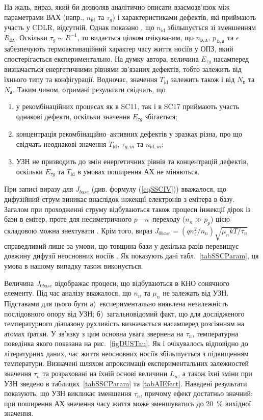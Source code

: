 На жаль, вираз, який би дозволяв аналітично описати взаємозв'язок між параметрами ВАХ (напр., $n_{\mathrm{id}}$ та $\tau_g$)
і характеристиками дефектів, які приймають участь у CDLR, відсутній.
Однак показано \cite{CDLR:JAP1995,CDLR:SSP}, що $n_{\mathrm{id}}$ збільшується зі зменшенням $R_{\mathtt{DA}}$.
Оскільки $\tau_g\sim R^{-1}$,
то видається цілком очікуваним, що $n_{\mathtt{D,A}}$, $p_{\,\mathtt{D,A}}$ та $\epsilon$ забезпечують термоактиваційний характер часу життя носіїв у ОПЗ, який спостерігається експериментально.
На  думку автора, величина $E_{\tau g}$ насамперед визначається енергетичними рівнями зв'язаних дефектів, тобто
залежить від їхнього типу та конфігурації.
Водночас, значення $T_\mathrm{id}$ залежить також і від $N_\mathtt{D}$ та $N_\mathtt{A}$.
Таким чином, отримані результати свідчать, що
\begin{enumerate}[label=\asbuk*),leftmargin=0em,itemindent=1.5em]
\item у рекомбінаційних процесах як в SC11, так і в SC17 приймають участь однакові дефекти, оскільки значення $E_{\tau g}$ збігається;
\item концентрація рекомбінаційно--активних дефектів у зразках різна, про що свідчать неоднакові значення $T_\mathrm{id}$, $\tau_{g,in}$ та $n_{\mathrm{id},in}$;
\item УЗН не призводить до змін енергетичних рівнів та концентрацій дефектів, оскільки  $E_{\tau g}$ та $T_\mathrm{id}$ в умовах поширення АХ не міняються.
\end{enumerate}

При записі виразу для $J_{base}$ (див. формулу (\ref{eqSSCIV})) вважалося, що дифузійний струм виникає внаслідок інжекції
електронів з емітера в базу.
Загалом при проходженні струму відбуваються також процеси інжекції дірок із бази в емітер, проте для несиметричного $p$---$n$--переходу
($n_n\gg p_p$) цією складовою можна знехтувати \cite{Breitenstein2013}.
Крім того, вираз $J_{0base}=(qn_i^2/n_n)\sqrt{\mu_nkT/\tau_n}$ справедливий лише за умови, що товщина бази у декілька разів перевищує
довжину дифузії неосновних носіїв \cite{Sze2012}.
Як показують дані табл.~\ref{tabSSCParam}, ця умова в нашому випадку також виконується.

Величина $J_{0base}$ відображає процеси, що відбуваються в КНО сонячного елементу.
Під час аналізу  вважалося, що $n_n$ та $\mu_n$ не залежать від УЗН.
Підставами для цього бути
а)~експериментально виявлена незалежність послідовного опору від УЗН;
б)~загальновідомий факт, що для дослідженого температурного діапазону рухливість визначається насамперед розсіянням на атомах ґратки.
У зв'язку з цим основна увага звернена на $\tau_n$, температурна поведінка якого показана на рис.~\ref{figDUSTau}.
Як і очікувалось відповідно до літературних даних, час життя неосновних носіїв збільшується з підвищенням температури.
Визначені шляхом апроксимації експериментальних залежностей значення $\tau_n$ та розраховані на їхній основі величини $L_n$,
а також їхні зміни при УЗН зведено в таблицях~\ref{tabSSCParam} та \ref{tabAIEfect}.
Наведені результати показують, що УЗН викликає зменшення $\tau_n$, причому ефект достатньо значний:
при поширення АХ значення часу життя може зменшуватись до 20~\% вихідної значення.

